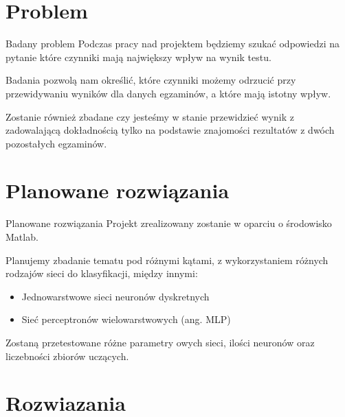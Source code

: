 \documentclass[10pt]{beamer}
\begin{document}
\section{Problem}
 
\begin{frame}{Badany problem}
Podczas pracy nad projektem będziemy szukać odpowiedzi na pytanie które czynniki mają największy wpływ na wynik testu.

Badania pozwolą nam określić, które czynniki możemy odrzucić przy przewidywaniu wyników dla danych egzaminów, a które mają istotny wpływ.

Zostanie również zbadane czy jesteśmy w stanie przewidzieć wynik z zadowalającą dokładnością tylko na podstawie znajomości rezultatów z dwóch pozostałych egzaminów.
 
\end{frame}

\section{Planowane rozwiązania}
 
\begin{frame}{Planowane rozwiązania}
Projekt zrealizowany zostanie w oparciu o środowisko Matlab.

Planujemy zbadanie tematu pod różnymi  kątami, z wykorzystaniem różnych rodzajów sieci do klasyfikacji, między innymi:
\begin{itemize}
\item Jednowarstwowe sieci neuronów dyskretnych
\item Sieć perceptronów wielowarstwowych (ang. MLP)
\end{itemize}

Zostaną przetestowane różne parametry owych sieci, ilości neuronów oraz liczebności zbiorów uczących.

 
\end{frame}

\section{Rozwiazania}
\end{document}
